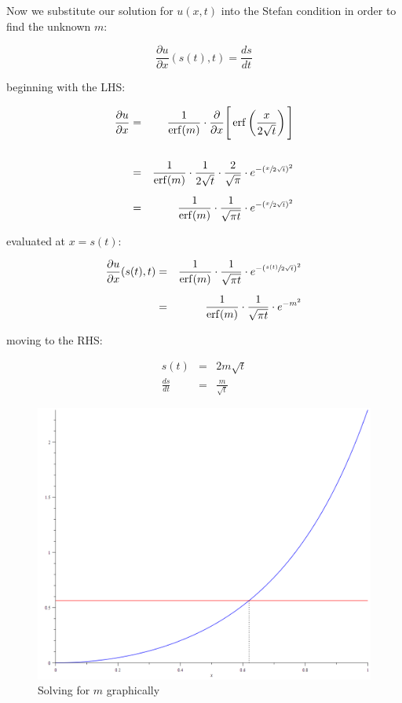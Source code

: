 \documentclass{report}
\DeclareMathOperator{\erf}{erf}
\begin{document}
Now we substitute our solution for $u(x, t)$ into the Stefan condition in order to find the unknown $m$:\bigskip

\[ \frac{\partial u}{\partial x} (s(t), t) = \frac{d s}{d t} \]\medskip

beginning with the LHS:\bigskip

\begin{eqnarray*} 
\frac{\partial u}{\partial x} & = & \frac{1}{\erf(m)} \cdot \frac{ \partial }{ \partial x } \Bigg[ \erf \left( \frac{x}{2 \sqrt{t}} \right) \Bigg] \\\\
                              & = & \frac{1}{\erf(m)} \cdot \frac{1}{ 2 \sqrt{t} } \cdot \frac{2}{ \sqrt{\pi} } \cdot e^{-(\sfrac{x}{2 \sqrt{t}})^2} \\\\
                              & = & \frac{1}{\erf(m)} \cdot \frac{1}{ \sqrt{\pi t} } \cdot e^{-(\sfrac{x}{2 \sqrt{t}})^2} 
\end{eqnarray*}\medskip

evaluated at $x = s(t)$:\bigskip

\begin{eqnarray*} 
\frac{\partial u}{\partial x} (s(t), t) & = & \frac{1}{\erf(m)} \cdot \frac{1}{ \sqrt{\pi t} } \cdot e^{-(\sfrac{s(t)}{2 \sqrt{t}})^2} \\\\
                                        & = & \frac{1}{\erf(m)} \cdot \frac{1}{ \sqrt{\pi t} } \cdot e^{-m^2} 
\end{eqnarray*}\medskip

moving to the RHS:\bigskip

\begin{eqnarray*}
           s(t) & = & 2 m \sqrt{t} \\
\frac{d s}{d t} & = & \frac{m}{ \sqrt{t} }
\end{eqnarray*}\medskip

\begin{figure}[b]
\centering
\includegraphics[scale = 0.15]{m-solved}
\caption{Solving for $m$ graphically}
\label{fig:m-solved}
\end{figure}
\end{document}

